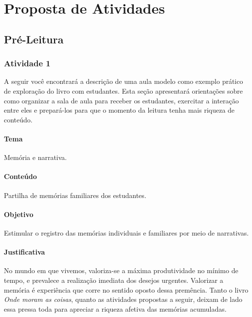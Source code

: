 \documentclass[11pt]{extarticle}
\begin{document}
\section{Proposta de Atividades}
\subsection{Pré-Leitura}
\subsubsection{Atividade 1}


A seguir você encontrará a descrição de uma aula modelo como exemplo prático de exploração do livro com estudantes. Esta seção apresentará orientações sobre como organizar a sala de aula para receber os estudantes, exercitar a interação entre eles e prepará-los para que o momento da leitura tenha mais riqueza de conteúdo. 

\paragraph{Tema} Memória e narrativa.

\paragraph{Conteúdo} Partilha de memórias familiares dos estudantes.  

\paragraph{Objetivo} Estimular o registro das memórias individuais e familiares por meio de narrativas. 

\paragraph{Justificativa} No mundo em que vivemos, valoriza-se a máxima produtividade no mínimo de tempo, e prevalece a realização imediata dos desejos urgentes. Valorizar a memória é experiência que corre no sentido oposto dessa premência. Tanto o livro \textit{Onde moram as coisas}, quanto as atividades propostas a seguir, deixam de lado essa pressa toda para apreciar a riqueza afetiva das memórias acumuladas.    
\end{document}
